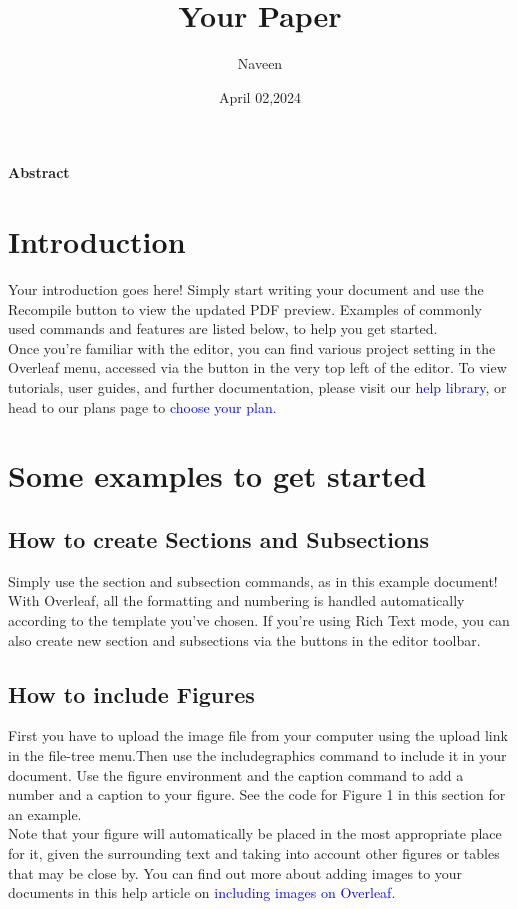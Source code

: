 \documentclass{article}
\title{Your Paper}
\author{Naveen}
\date{April 02,2024}
\begin{document}
	\maketitle
	
	\centering \textbf{Abstract\\}
	
	\section{Introduction} 
	Your introduction goes here! Simply start writing your document and use the Recompile button to view the updated PDF preview. Examples of commonly used commands and features are listed below, to help you get started.\\
	 \hspace{1cm}Once you’re familiar with the editor, you can find various project setting in the Overleaf menu, accessed via the button in the very top left of the editor. To view tutorials, user guides, and further documentation, please visit our \textcolor{blue}{help library}, or head to our plans page to \textcolor{blue}{choose your plan.}
	
	\section{Some examples to get started}
	\subsection{How to create Sections and Subsections}
	Simply use the section and subsection commands, as in this example document! With Overleaf, all
	the formatting and numbering is handled automatically according to the template you’ve chosen. If you’re using Rich Text mode, you can also create new section and subsections via the buttons in the editor toolbar.
	
	\subsection{How to include Figures}
	First you have to upload the image file from your computer using the upload link in the file-tree menu.Then use the includegraphics command to include it in your document. Use the figure environment and the caption command to add a number and a caption to your figure. See the code for Figure 1 in this section for an example.\\
	\hspace{1cm} Note that your figure will automatically be placed in the most appropriate place for it, given the surrounding text and taking into account other figures or tables that may be close by. You can find out more about adding images to your documents in this help article on \textcolor{blue}{including images on Overleaf.}\\
	
\end{document}
